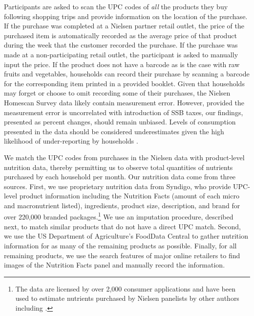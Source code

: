 \documentclass[12pt]{article}
\begin{document}
Participants are asked to scan the UPC codes of \textit{all} the products they buy following shopping trips and provide information on the location of the purchase. If the purchase was completed at a Nielsen partner retail outlet, the price of the purchased item is automatically recorded as the average price of that product during the week that the customer recorded the purchase. If the purchase was made at a non-participating retail outlet, the participant is asked to manually input the price. If the product does not have a barcode as is the case with raw fruits and vegetables, households can record their purchase by scanning a barcode for the corresponding item printed in a provided booklet. Given that households may forget or choose to omit recording some of their purchases, the Nielsen Homescan Survey data likely contain measurement error. However, provided the measurement error is uncorrelated with introduction of SSB taxes, our findings, presented as percent changes, should remain unbiased. Levels of consumption presented in the data should be considered underestimates given the high likelihood of under-reporting by households \parencite{einav2010recording}.

We match the UPC codes from purchases in the Nielsen data with product-level nutrition data, thereby permitting us to observe total quantities of nutrients purchased by each household per month. Our nutrition data come from three sources. First, we use proprietary nutrition data from Syndigo, who provide UPC-level product information including the Nutrition Facts (amount of each micro and macronutrient listed), ingredients, product size, description, and brand for over 220,000 branded packages.\footnote{The data are licensed by over 2,000 consumer applications and have been used to estimate nutrients purchased by Nielsen panelists by other authors including \textcite{dubois2014prices}.} We use an imputation procedure, described next, to match similar products that do not have a direct UPC match. Second, we use the US Department of Agriculture's FoodData Central to gather nutrition information for as many of the remaining products as possible. Finally, for all remaining products, we use the search features of major online retailers to find images of the Nutrition Facts panel and manually record the information.
\end{document}
